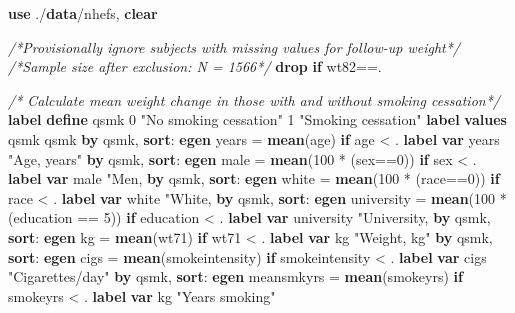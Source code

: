 \documentclass[
  10pt,
]{book}
\newenvironment{Shaded}{\begin{snugshade}}{\end{snugshade}}
\newcommand{\BaseNTok}[1]{\textcolor[rgb]{0.00,0.00,0.81}{#1}}
\newcommand{\CommentTok}[1]{\textcolor[rgb]{0.56,0.35,0.01}{\textit{#1}}}
\newcommand{\KeywordTok}[1]{\textcolor[rgb]{0.13,0.29,0.53}{\textbf{#1}}}
\newcommand{\NormalTok}[1]{#1}
\newcommand{\StringTok}[1]{\textcolor[rgb]{0.31,0.60,0.02}{#1}}
\begin{document}
\begin{Shaded}
\begin{Highlighting}[]
\KeywordTok{use}\NormalTok{ ./}\KeywordTok{data}\NormalTok{/nhefs, }\KeywordTok{clear}

\CommentTok{/*Provisionally ignore subjects with missing values for follow-up weight*/}
\CommentTok{/*Sample size after exclusion: N = 1566*/}
\KeywordTok{drop} \KeywordTok{if}\NormalTok{ wt82==.}

\CommentTok{/* Calculate mean weight change in those with and without smoking cessation*/}
\KeywordTok{label} \KeywordTok{define}\NormalTok{ qsmk 0 }\StringTok{"No smoking cessation"}\NormalTok{ 1 }\StringTok{"Smoking cessation"}
\KeywordTok{label} \KeywordTok{values}\NormalTok{ qsmk qsmk}
\KeywordTok{by}\NormalTok{ qsmk, }\KeywordTok{sort}\NormalTok{: }\KeywordTok{egen}\NormalTok{ years = }\KeywordTok{mean}\NormalTok{(age) }\KeywordTok{if}\NormalTok{ age < . }
\KeywordTok{label} \KeywordTok{var}\NormalTok{ years }\StringTok{"Age, years"}
\KeywordTok{by}\NormalTok{ qsmk, }\KeywordTok{sort}\NormalTok{: }\KeywordTok{egen}\NormalTok{ male = }\KeywordTok{mean}\NormalTok{(100 * (sex==0)) }\KeywordTok{if}\NormalTok{ sex < . }
\KeywordTok{label} \KeywordTok{var}\NormalTok{ male }\StringTok{"Men, %
\KeywordTok{by}\NormalTok{ qsmk, }\KeywordTok{sort}\NormalTok{: }\KeywordTok{egen} \BaseNTok{white}\NormalTok{ = }\KeywordTok{mean}\NormalTok{(100 * (race==0)) }\KeywordTok{if}\NormalTok{ race < . }
\KeywordTok{label} \KeywordTok{var} \BaseNTok{white} \StringTok{"White, %
\KeywordTok{by}\NormalTok{ qsmk, }\KeywordTok{sort}\NormalTok{: }\KeywordTok{egen}\NormalTok{ university = }\KeywordTok{mean}\NormalTok{(100 * (education == 5)) }\KeywordTok{if}\NormalTok{ education < .}
\KeywordTok{label} \KeywordTok{var}\NormalTok{ university }\StringTok{"University, %
\KeywordTok{by}\NormalTok{ qsmk, }\KeywordTok{sort}\NormalTok{: }\KeywordTok{egen}\NormalTok{ kg = }\KeywordTok{mean}\NormalTok{(wt71) }\KeywordTok{if}\NormalTok{ wt71 < .}
\KeywordTok{label} \KeywordTok{var}\NormalTok{ kg }\StringTok{"Weight, kg"}
\KeywordTok{by}\NormalTok{ qsmk, }\KeywordTok{sort}\NormalTok{: }\KeywordTok{egen}\NormalTok{ cigs = }\KeywordTok{mean}\NormalTok{(smokeintensity) }\KeywordTok{if}\NormalTok{ smokeintensity < . }
\KeywordTok{label} \KeywordTok{var}\NormalTok{ cigs }\StringTok{"Cigarettes/day"}
\KeywordTok{by}\NormalTok{ qsmk, }\KeywordTok{sort}\NormalTok{: }\KeywordTok{egen}\NormalTok{ meansmkyrs = }\KeywordTok{mean}\NormalTok{(smokeyrs) }\KeywordTok{if}\NormalTok{ smokeyrs < .}
\KeywordTok{label} \KeywordTok{var}\NormalTok{ kg }\StringTok{"Years smoking"}
}}}
\end{Highlighting}
\end{Shaded}
\end{document}
